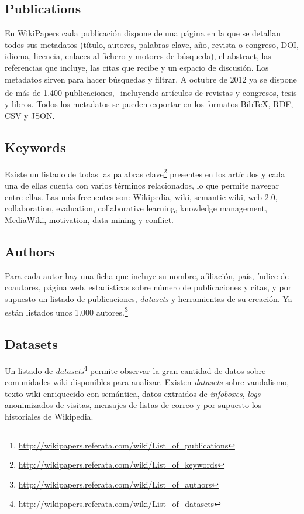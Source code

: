 \documentclass[11pt,twocolumn]{article}
\begin{document}
\subsection{Publications}
En WikiPapers cada publicación dispone de una página en la que se detallan todos sus metadatos (título, autores, palabras clave, año, revista o congreso, DOI, idioma, licencia, enlaces al fichero y motores de búsqueda), el abstract, las referencias que incluye, las citas que recibe y un espacio de discusión. Los metadatos sirven para hacer búsquedas y filtrar. A octubre de 2012 ya se dispone de más de 1.400 publicaciones,\footnote{\href{http://wikipapers.referata.com/wiki/List_of_publications}{http://wikipapers.referata.com/wiki/List\_of\_publications}} incluyendo artículos de revistas y congresos, tesis y libros. Todos los metadatos se pueden exportar en los formatos BibTeX, RDF, CSV y JSON.

\subsection{Keywords}
Existe un listado de todas las palabras clave\footnote{\href{http://wikipapers.referata.com/wiki/List_of_keywords}{http://wikipapers.referata.com/wiki/List\_of\_keywords}} presentes en los artículos y cada una de ellas cuenta con varios términos relacionados, lo que permite navegar entre ellas. Las más frecuentes son: Wikipedia, wiki, semantic wiki, web 2.0, collaboration, evaluation, collaborative learning, knowledge management, MediaWiki, motivation, data mining y conflict. 

\subsection{Authors}
Para cada autor hay una ficha que incluye su nombre, afiliación, país, índice de coautores, página web, estadísticas sobre número de publicaciones y citas, y por supuesto un listado de publicaciones, \emph{datasets} y herramientas de su creación. Ya están listados unos 1.000 autores.\footnote{\href{http://wikipapers.referata.com/wiki/List_of_authors}{http://wikipapers.referata.com/wiki/List\_of\_authors}}

\subsection{Datasets}
Un listado de \emph{datasets}\footnote{\href{http://wikipapers.referata.com/wiki/List_of_datasets}{http://wikipapers.referata.com/wiki/List\_of\_datasets}} permite observar la gran cantidad de datos sobre comunidades wiki disponibles para analizar. Existen \emph{datasets} sobre vandalismo, texto wiki enriquecido con semántica, datos extraidos de \emph{infoboxes}, \emph{logs} anonimizados de visitas, mensajes de listas de correo y por supuesto los historiales de Wikipedia.
\end{document}
